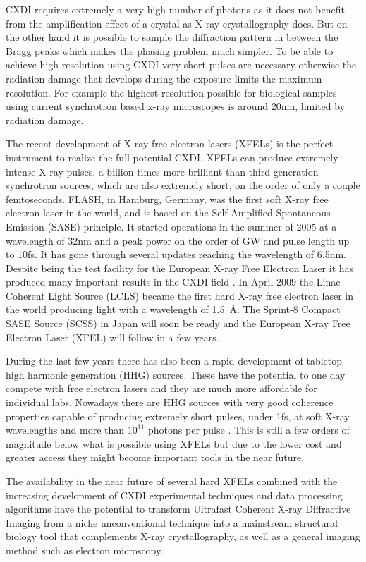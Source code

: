 CXDI requires extremely a very high number of photons as it does not benefit from the
amplification effect of a crystal as X-ray crystallography does. But on the
other hand it is possible to sample the diffraction pattern in between the Bragg
peaks which makes the phasing problem much simpler. To be able to achieve high
resolution using CXDI very short pulses are necessary otherwise the radiation
damage that develops during the exposure limits the maximum resolution. For
example the highest resolution possible for biological samples using current
synchrotron based x-ray microscopes is around 20nm, limited by radiation damage.

The recent development of X-ray free electron lasers (XFELs) is the perfect
instrument to realize the full potential CXDI. XFELs can produce extremely
intense X-ray pulses, a billion times more brilliant than third
generation synchrotron sources, which are also extremely short, on the order of
only a couple femtoseconds. FLASH, in Hamburg, Germany, was the first soft X-ray
free electron laser in the world, and is based on the Self Amplified Spontaneous
Emission (SASE) principle. It started operations in the summer of 2005 at
a wavelength of 32nm and a peak power on the order of GW and pulse length up to
10fs. It has gone through several updates reaching the wavelength of
6.5nm. Despite being the test facility for the European X-ray Free Electron
Laser it has produced many important results in the CXDI field \cite{Cowboys, Chapman Holography}. In April 2009 the Linac Coherent Light Source (LCLS)
became the first hard X-ray free electron laser in the world producing light
with a wavelength of \mbox{1.5 \AA}. The Sprint-8 Compact SASE Source (SCSS) in
Japan will soon be ready and the European X-ray Free Electron Laser (XFEL)
will follow in a few years.

During the last few years there has also been a rapid development of tabletop
high harmonic generation (HHG) sources. These have the potential to one day
compete with free electron lasers and they are much more affordable for
individual labs. Nowadays there are HHG sources with very good coherence
properties capable of producing extremely short pulses, under 1fs, at soft X-ray wavelengths and more than $10^{11}$ photons
per pulse \cite{Ravasio}. This is still a few orders of magnitude below what is
possible using XFELs but due to the lower cost and greater access they might
become important tools in the near future.

The availability in the near future of several hard XFELs combined with the
increasing development of CXDI experimental techniques and data processing
algorithms have the potential to transform Ultrafast Coherent X-ray Diffractive
Imaging from a niche unconventional technique into a mainstream structural
biology tool that complements X-ray crystallography, as well as a general
imaging method such as electron microscopy.


